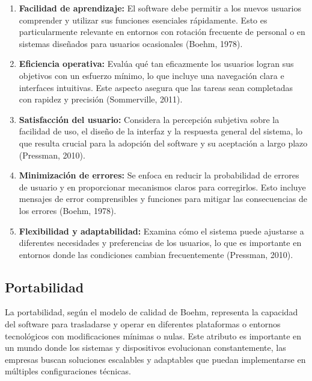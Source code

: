 		\begin{enumerate}[label=\textbf{\alph*)}, left=0cm, labelsep = 0.8cm, topsep = 0pt, parsep = 0pt] %
			\item \textbf{Facilidad de aprendizaje:} El software debe permitir a los nuevos usuarios comprender y utilizar sus funciones esenciales rápidamente. Esto es particularmente relevante en entornos con rotación frecuente de personal o en sistemas diseñados para usuarios ocasionales (Boehm, 1978).
			\item \textbf{Eficiencia operativa:} Evalúa qué tan eficazmente los usuarios logran sus objetivos con un esfuerzo mínimo, lo que incluye una navegación clara e interfaces intuitivas. Este aspecto asegura que las tareas sean completadas con rapidez y precisión (Sommerville, 2011).
			\item \textbf{Satisfacción del usuario:} Considera la percepción subjetiva sobre la facilidad de uso, el diseño de la interfaz y la respuesta general del sistema, lo que resulta crucial para la adopción del software y su aceptación a largo plazo (Pressman, 2010).
			\item \textbf{Minimización de errores:} Se enfoca en reducir la probabilidad de errores de usuario y en proporcionar mecanismos claros para corregirlos. Esto incluye mensajes de error comprensibles y funciones para mitigar las consecuencias de los errores (Boehm, 1978).
			\item \textbf{Flexibilidad y adaptabilidad:} Examina cómo el sistema puede ajustarse a diferentes necesidades y preferencias de los usuarios, lo que es importante en entornos donde las condiciones cambian frecuentemente (Pressman, 2010).
		\end{enumerate}
			
		\subsection{Portabilidad}
		
		La portabilidad, según el modelo de calidad de Boehm, representa la capacidad del software para trasladarse y operar en diferentes plataformas o entornos tecnológicos con modificaciones mínimas o nulas. Este atributo es importante en un mundo donde los sistemas y dispositivos evolucionan constantemente, las empresas buscan soluciones escalables y adaptables que puedan implementarse en múltiples configuraciones técnicas.

